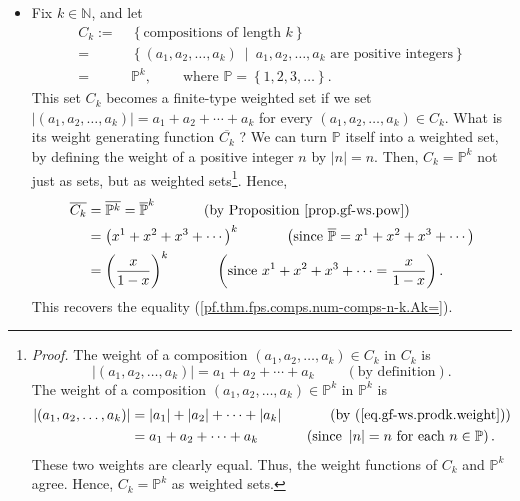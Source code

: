 \begin{itemize}
\item Fix $k\in\mathbb{N}$, and let
\begin{align*}
C_{k}:=  &  \ \left\{  \text{compositions of length }k\right\} \\
=  &  \ \left\{  \left(  a_{1},a_{2},\ldots,a_{k}\right)  \ \mid\ a_{1}%
,a_{2},\ldots,a_{k}\text{ are positive integers}\right\} \\
=  &  \ \mathbb{P}^{k},\ \ \ \ \ \ \ \ \ \ \text{where }\mathbb{P}=\left\{
1,2,3,\ldots\right\}  .
\end{align*}
This set $C_{k}$ becomes a finite-type weighted set if we set $\left\vert
\left(  a_{1},a_{2},\ldots,a_{k}\right)  \right\vert =a_{1}+a_{2}+\cdots
+a_{k}$ for every $\left(  a_{1},a_{2},\ldots,a_{k}\right)  \in C_{k}$. What
is its weight generating function $\overline{C_{k}}$ ? We can turn
$\mathbb{P}$ itself into a weighted set, by defining the weight of a positive
integer $n$ by $\left\vert n\right\vert =n$. Then, $C_{k}=\mathbb{P}^{k}$ not
just as sets, but as weighted sets\footnote{\textit{Proof.} The weight of a
composition $\left(  a_{1},a_{2},\ldots,a_{k}\right)  \in C_{k}$ in $C_{k}$ is%
\[
\left\vert \left(  a_{1},a_{2},\ldots,a_{k}\right)  \right\vert =a_{1}%
+a_{2}+\cdots+a_{k}\ \ \ \ \ \ \ \ \ \ \left(  \text{by definition}\right)  .
\]
The weight of a composition $\left(  a_{1},a_{2},\ldots,a_{k}\right)
\in\mathbb{P}^{k}$ in $\mathbb{P}^{k}$ is%
\begin{align*}
\left\vert \left(  a_{1},a_{2},\ldots,a_{k}\right)  \right\vert  &
=\left\vert a_{1}\right\vert +\left\vert a_{2}\right\vert +\cdots+\left\vert
a_{k}\right\vert \ \ \ \ \ \ \ \ \ \ \left(  \text{by
(\ref{eq.gf-ws.prodk.weight})}\right) \\
&  =a_{1}+a_{2}+\cdots+a_{k}\ \ \ \ \ \ \ \ \ \ \left(  \text{since
}\left\vert n\right\vert =n\text{ for each }n\in\mathbb{P}\right)  .
\end{align*}
These two weights are clearly equal. Thus, the weight functions of $C_{k}$ and
$\mathbb{P}^{k}$ agree. Hence, $C_{k}=\mathbb{P}^{k}$ as weighted sets.}.
Hence,%
\begin{align*}
\overline{C_{k}}  &  =\overline{\mathbb{P}^{k}}=\overline{\mathbb{P}}%
^{k}\ \ \ \ \ \ \ \ \ \ \left(  \text{by Proposition \ref{prop.gf-ws.pow}%
}\right) \\
&  =\left(  x^{1}+x^{2}+x^{3}+\cdots\right)  ^{k}\ \ \ \ \ \ \ \ \ \ \left(
\text{since }\overline{\mathbb{P}}=x^{1}+x^{2}+x^{3}+\cdots\right) \\
&  =\left(  \dfrac{x}{1-x}\right)  ^{k}\ \ \ \ \ \ \ \ \ \ \left(  \text{since
}x^{1}+x^{2}+x^{3}+\cdots=\dfrac{x}{1-x}\right)  .
\end{align*}
This recovers the equality (\ref{pf.thm.fps.comps.num-comps-n-k.Ak=}).


\end{itemize}
